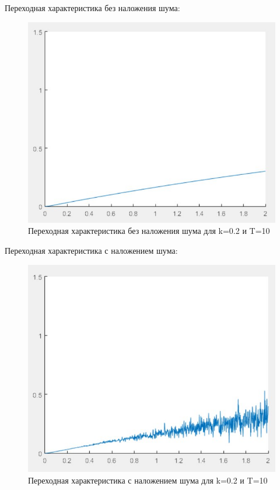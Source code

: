 \documentclass[14pt,a4paper,report]{report}
\begin{document}
	\clearpage
	
	Переходная характеристика без наложения шума:
	
	\begin{figure}[h!]
		\centering
		\includegraphics[scale = 0.55]{images/step10.jpg}
		\caption{Переходная характеристика без наложения шума для k=0.2 и T=10}
		\label{image:4}
	\end{figure}
	
	Переходная характеристика с наложением шума:
	
	\begin{figure}[h!]
		\centering
		\includegraphics[scale = 0.55]{images/stepnoice10.jpg}
		\caption{Переходная характеристика с наложением шума для k=0.2 и T=10}
		\label{image:5}
	\end{figure}
\end{document}
